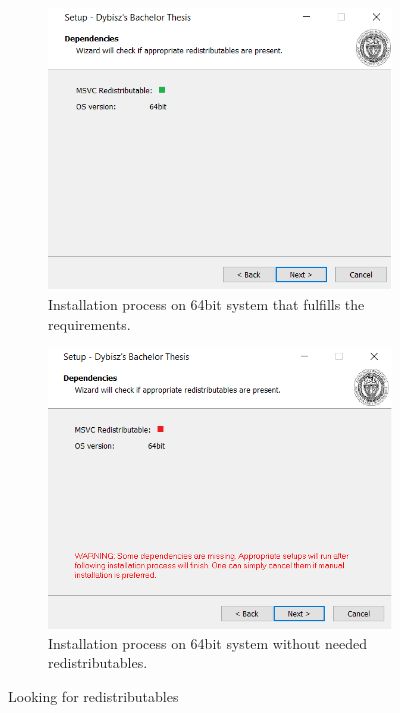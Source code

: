 \documentclass{report}
\begin{document}
\begin{figure}[H]
\begin{subfigure}{.5\textwidth}
  \centering
  \includegraphics[width=.9\linewidth]{images/installation_2.png}
  \caption{Installation process on 64bit system that fulfills the requirements.}
  \label{fig:isntallation_2}
\end{subfigure}%
\begin{subfigure}{.5\textwidth}
  \centering
  \includegraphics[width=.9\linewidth]{images/installation_2_error.png}
  \caption{Installation process on 64bit system without needed redistributables.}
  \label{fig:installation_2_error}
\end{subfigure}
\caption{Looking for redistributables}
\label{fig:installation_redists}
\end{figure}
\end{document}
